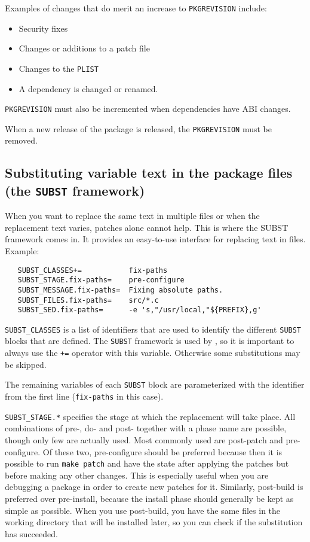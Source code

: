 Examples of changes that do merit an increase to {\tt PKGREVISION} include:
\begin{itemize}
   \item Security fixes
   \item Changes or additions to a patch file
   \item Changes to the {\tt PLIST}
   \item A dependency is changed or renamed.
\end{itemize}

{\tt PKGREVISION} must also be incremented when dependencies have ABI changes.

When a new release of the package is released, the {\tt PKGREVISION} must be
removed.


\subsection{Substituting variable text in the package files
(the {\tt SUBST} framework)} %
\label{section:fixing:SUBST}

When you want to replace the same text in multiple files or when the
replacement text varies, patches alone cannot help. This is where the SUBST
framework comes in. It provides an easy-to-use interface for replacing text in
files. Example:
\begin{verbatim}
   SUBST_CLASSES+=           fix-paths
   SUBST_STAGE.fix-paths=    pre-configure
   SUBST_MESSAGE.fix-paths=  Fixing absolute paths.
   SUBST_FILES.fix-paths=    src/*.c
   SUBST_SED.fix-paths=      -e 's,"/usr/local,"${PREFIX},g'
\end{verbatim}

{\tt SUBST\_CLASSES}  is a list  of identifiers that  are used to  identify the
different {\tt  SUBST} blocks  that are defined.  The {\tt SUBST}  framework is
used by  \robotpkg{}, so it  is important to  always use the {\tt  +=} operator
with this variable. Otherwise some substitutions may be skipped.

The remaining  variables of each {\tt  SUBST} block are  parameterized with the
identifier from the first line ({\tt fix-paths} in this case).

{\tt SUBST\_STAGE.*}  specifies the  stage at which  the replacement  will take
place. All combinations  of pre-, do- and post- together with  a phase name are
possible, though only few are  actually used. Most commonly used are post-patch
and pre-configure. Of these two, pre-configure should be preferred because then
it is possible  to run {\tt make  patch} and have the state  after applying the
patches but before making any other changes. This is especially useful when you
are debugging  a package  in order  to create new  patches for  it.  Similarly,
post-build  is preferred  over pre-install,  because the  install  phase should
generally be kept as simple as  possible. When you use post-build, you have the
same files  in the working directory that  will be installed later,  so you can
check if the substitution has succeeded.


